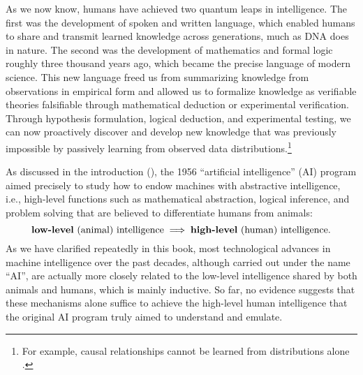 \documentclass[../../book-main.tex]{subfiles}
\begin{document}
As we now know, humans have achieved two quantum leaps in intelligence. The first was the development of spoken and written language, which enabled humans to share and transmit learned knowledge across generations, much as DNA does in nature. The second was the development of mathematics and formal logic roughly three thousand years ago, which became the precise language of modern science. This new language freed us from summarizing knowledge from observations in empirical form and allowed us to formalize knowledge as verifiable theories falsifiable through mathematical deduction or experimental verification. Through hypothesis formulation, logical deduction, and experimental testing, we can now proactively discover and develop new knowledge that was previously impossible by passively learning from observed data distributions.\footnote{For example, causal relationships cannot be learned from distributions alone \cite{Pearl-2009}.}

As discussed in the introduction (), the 1956 ``artificial intelligence'' (AI) program aimed precisely to study how to endow machines with abstractive intelligence, i.e., high-level functions such as mathematical abstraction, logical inference, and problem solving that are believed to differentiate humans from animals:
\begin{equation}
   \text{\textbf{low-level} (animal) intelligence} \; \Longrightarrow \; 
   \text{\textbf{high-level} (human) intelligence.}
\end{equation}
As we have clarified repeatedly in this book, most technological advances in machine intelligence over the past decades, although carried out under the name ``AI'', are actually more closely related to the low-level intelligence shared by both animals and humans, which is mainly inductive. So far, no evidence suggests that these mechanisms alone suffice to achieve the high-level human intelligence that the original AI program truly aimed to understand and emulate.
\end{document}

